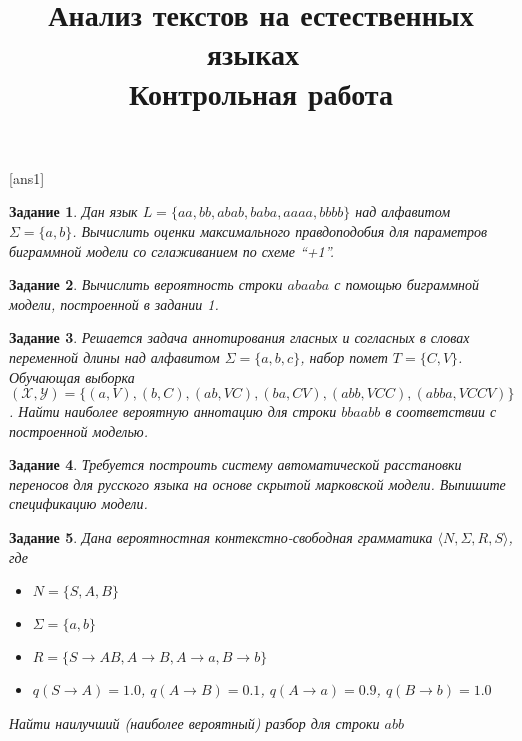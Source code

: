 \documentclass[10pt]{article}
\theoremstyle{example-style}
\newtheorem{example}{Задание}
\begin{document}
 

\title{Анализ текстов на естественных языках\ \\{\large Контрольная работа}}
\author{}
\date{}

\maketitle

[ans1]


\begin{example}
Дан язык $L = \{aa, bb, abab, baba, aaaa, bbbb\}$ над алфавитом $\Sigma = \{a, b\}$. Вычислить оценки максимального правдоподобия для параметров биграммной модели со сглаживанием по схеме ``+1''.
\end{example}

\begin{example}
Вычислить вероятность строки $abaaba$ с помощью биграммной модели, построенной в задании 1.
\end{example}


\begin{example}
Решается задача аннотирования гласных и согласных в словах переменной длины над алфавитом $\Sigma = \{a, b, c\}$, набор помет $T = \{C, V\}$.
Обучающая выборка $(\mathcal{X}, \mathcal{Y}) = \{(a, V), (b, C), (ab, VC), (ba, CV), (abb, VCC), (abba, VCCV) \}$. Найти наиболее вероятную аннотацию для строки $bbaabb$ в соответствии с построенной моделью.
\end{example}


\begin{example}
Требуется построить систему автоматической расстановки переносов для русского языка на основе скрытой марковской модели. Выпишите спецификацию модели.
\end{example}

\begin{example}
Дана вероятностная контекстно-свободная грамматика $\langle N, \Sigma, R, S\rangle$, где 
\begin{itemize}
	\item $N = \{S, A, B\}$
	\item $\Sigma = \{a, b\}$
	\item $R = \{ S \to AB, A \to B, A \to a, B \to b \}$
	\item $q(S \to A) = 1.0$, $q(A \to B) = 0.1$, $q(A \to a) = 0.9$, $q(B \to b) = 1.0$
\end{itemize}

Найти наилучший (наиболее вероятный) разбор для строки $abb$
\end{example}

\end{document}
